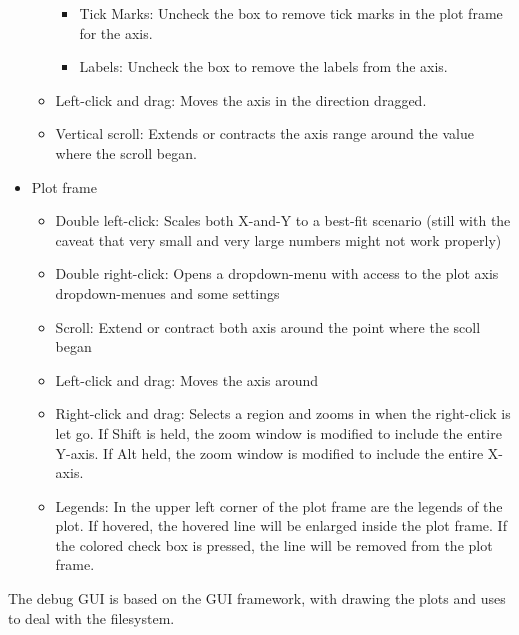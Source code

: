 \begin{itemize}
\begin{itemize}
\begin{itemize}
     \item Tick Marks: Uncheck the box to remove tick marks in the plot frame for the axis.
     \item Labels: Uncheck the box to remove the labels from the axis.
    \end{itemize}
  \item Left-click and drag:  Moves the axis in the direction dragged.
  \item Vertical scroll:  Extends or contracts the axis range around the value where the scroll began.
  \end{itemize}
 \item Plot frame
  \begin{itemize}
   \item Double left-click: Scales both X-and-Y to a best-fit scenario (still with the caveat that very small and very large numbers might not work properly)
   \item Double right-click:  Opens a dropdown-menu with access to the plot axis dropdown-menues and some settings
   \item Scroll:  Extend or contract both axis around the point where the scoll began
   \item Left-click and drag:  Moves the axis around
   \item Right-click and drag:  Selects a region and zooms in when the right-click is let go.  If Shift is held, the zoom window is modified to include the entire Y-axis.  If Alt held, the zoom window is modified to include the entire X-axis.
   \item Legends:  In the upper left corner of the plot frame are the legends of the plot.  If hovered, the hovered line will be enlarged inside the plot frame.  If the colored check box is pressed, the line will be removed from the plot frame.
  \end{itemize}
\end{itemize}

The debug GUI is based on the  GUI framework, with 
drawing the plots and uses  to deal with the filesystem.
